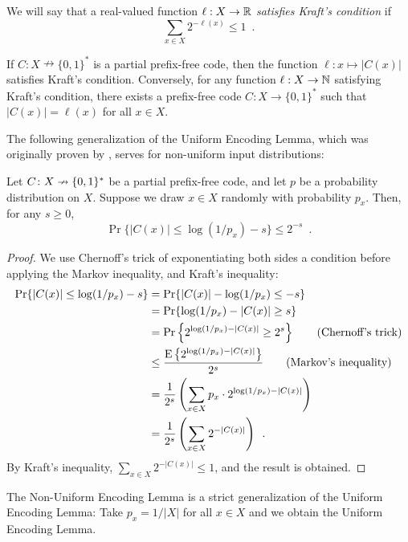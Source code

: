 \documentclass[format=acmsmall, review=false, screen=true]{acmart}
\begin{document}
We will say that a real-valued function $\ell : X \to \mathbb{R}$
\emph{satisfies Kraft's condition} if
\[
  \sum_{x \in X} 2^{-\ell(x)} \leq 1 \enspace .
\]
\begin{lem}
  If $C : X \nrightarrow \{0,1\}^*$ is a partial prefix-free code,
  then the function  $\ell : x \mapsto |C(x)|$ satisfies Kraft's condition. Conversely, for any
  function $\ell : X \to \mathbb{N}$ satisfying Kraft's condition, there
  exists a prefix-free code $C : X \to \{0, 1\}^*$ such that
  $|C(x)| = \ell(x)$ for all $x \in X$.
\end{lem}

The following generalization of the Uniform Encoding Lemma, which was
originally proven by ,
serves for non-uniform input distributions:
\begin{lem}  
  Let $C\colon X\nrightarrow\{0,1\}^*$ be a partial prefix-free code,
  and let $p$ be a probability distribution on $X$.  Suppose we draw
  $x \in X$ randomly with probability $p_x$.  Then, for any
  $s \geq 0$,
  \[
    \Pr\{ |C(x)| \le \log(1/p_x)-s\} \le 2^{-s} \enspace .
  \]
\end{lem}

\begin{proof}
  We use Chernoff's trick of exponentiating both sides a condition
  before applying the Markov inequality, and Kraft's
  inequality:
  \begin{align*}
    \Pr\{ |C(x)| \le\log(1/p_x)-s \}
    & = \Pr\{|C(x)| -\log(1/p_x) \le -s \} \\
    & = \Pr\{\log(1/p_x)-|C(x)| \ge s \} \\
    & = \Pr\left\{2^{\log(1/p_x)-|C(x)|} \ge 2^s \right\}  \tag{Chernoff's trick} \\
    & \le \frac{\operatorname{\mathrm{E}}\left\{2^{\log(1/p_x)-|C(x)|}\right\}}{2^s} \tag{Markov's inequality} \\
    & = \frac{1}{2^s} \left(\sum_{x\in X} p_x\cdot 2^{\log(1/p_x)-|C(x)|}\right) \\
    & = \frac{1}{2^s} \left(\sum_{x\in X}2^{-|C(x)|}\right) \enspace .
  \end{align*}
  By Kraft's inequality,
  $\sum_{x \in X} 2^{-|C(x)|} \leq 1$, and the result
  is obtained.
\end{proof}

The Non-Uniform Encoding Lemma is a strict generalization
of the Uniform Encoding Lemma: Take $p_x=1/|X|$ for all $x\in X$ and
we obtain the Uniform Encoding Lemma.
\end{document}
